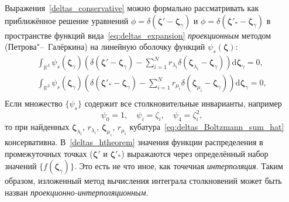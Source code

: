 \documentclass{article}
\newcommand{\dd}{\mathrm{d}}
\newcommand{\dzeta}{\boldsymbol{\dd\zeta}}
\newcommand{\bzeta}{\boldsymbol{\zeta}}
\begin{document}
Выражения~\eqref{deltas_conservative} можно формально рассматривать как приближённое решение уравнений
\(\phi=\delta(\bzeta'-\bzeta_\gamma)\) и \(\phi=\delta(\bzeta'_*-\bzeta_\gamma)\)
в пространстве функций вида~\eqref{eq:deltas_expansion}
\emph{проекционным} методом (Петрова"--~Галёркина) на линейную оболочку функций \(\psi_s(\bzeta)\):
\begin{gather}
    \int_{\mathbb{R}^3} \psi_s(\bzeta_\gamma) \left( \delta(\bzeta'-\bzeta_\gamma)
        - \sum_{i=1}^N r_{\lambda_i} \delta(\bzeta_{\lambda_i}-\bzeta_\gamma) \right) \dzeta_\gamma = 0, \label{lambda_galerkin}\\
    \int_{\mathbb{R}^3} \psi_s(\bzeta_\gamma) \left( \delta(\bzeta'_*-\bzeta_\gamma)
        - \sum_{i=1}^N r_{\mu_i} \delta(\bzeta_{\mu_i}-\bzeta_\gamma) \right) \dzeta_\gamma = 0, \label{mu_galerkin}\\
\end{gather}
Если множество \(\{\psi_s\}\) содержит все столкновительные инварианты, например
\begin{equation}\label{collision_invariants}
    \psi_0 = 1, \quad \psi_i = \zeta_i, \quad \psi_4 = \zeta_i^2,
\end{equation}
то при найденных \(\bzeta_{\lambda_i}\), \(r_{\lambda_i}\), \(\bzeta_{\mu_i}\), \(r_{\mu_i}\)
кубатура~\eqref{eq:deltas_Boltzmann_sum_hat} консервативна.
В~\eqref{deltas_htheorem} значения функции распределения в промежуточных точках (\(\bzeta'\) и \(\bzeta'_*\))
выражаются через определённый набор значений \(\{f(\bzeta_\gamma)\}\).
Это есть не что иное, как точечная \emph{интерполяция}.
Таким образом, изложенный метод вычисления интеграла столкновений может быть назван \emph{проекционно-интерполяционным}.
\end{document}
